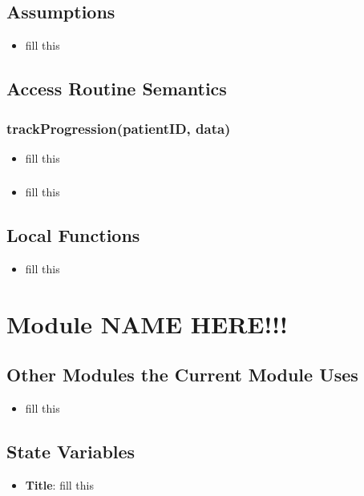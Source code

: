 \documentclass[12pt, titlepage]{article}
\begin{document}
\subsection{Assumptions}
\begin{itemize}
    \item fill this
\end{itemize}

\subsection{Access Routine Semantics}
\subsubsection{trackProgression(patientID, data)}

\begin{itemize}
    \item fill this
\end{itemize}

\subsubsection{}

\begin{itemize}
    \item fill this
\end{itemize}

\subsection{Local Functions}
\begin{itemize}
    \item fill this
\end{itemize}
\section{Module NAME HERE!!!}

\subsection{Other Modules the Current Module Uses}
\begin{itemize}
    \item fill this 
\end{itemize}

\subsection{State Variables}
\begin{itemize}
    \item \textbf{Title}: fill this 
\end{itemize}
\end{document}
